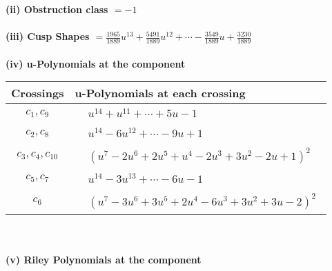 \documentclass[1p]{elsarticle_modified}
\theoremstyle{definition}
\begin{document}
\flushleft \textbf{(ii) Obstruction class $= -1$}\\~\\
\flushleft \textbf{(iii) Cusp Shapes $= \frac{1965}{1889} u^{13}+\frac{5491}{1889} u^{12}+\cdots-\frac{3549}{1889} u+\frac{3230}{1889}$}\\~\\
\newpage\renewcommand{\arraystretch}{1}
\flushleft \textbf{(iv) u-Polynomials at the component}\newline \\
\begin{tabular}{m{50pt}|m{274pt}}
Crossings & \hspace{64pt}u-Polynomials at each crossing \\
\hline $$\begin{aligned}c_{1},c_{9}\end{aligned}$$&$\begin{aligned}
&u^{14}+u^{11}+\cdots+5 u-1
\end{aligned}$\\
\hline $$\begin{aligned}c_{2},c_{8}\end{aligned}$$&$\begin{aligned}
&u^{14}-6 u^{12}+\cdots-9 u+1
\end{aligned}$\\
\hline $$\begin{aligned}c_{3},c_{4},c_{10}\end{aligned}$$&$\begin{aligned}
&(u^7-2 u^6+2 u^5+u^4-2 u^3+3 u^2-2 u+1)^2
\end{aligned}$\\
\hline $$\begin{aligned}c_{5},c_{7}\end{aligned}$$&$\begin{aligned}
&u^{14}-3 u^{13}+\cdots-6 u-1
\end{aligned}$\\
\hline $$\begin{aligned}c_{6}\end{aligned}$$&$\begin{aligned}
&(u^7-3 u^6+3 u^5+2 u^4-6 u^3+3 u^2+3 u-2)^2
\end{aligned}$\\
\hline
\end{tabular}\\~\\
\newpage\renewcommand{\arraystretch}{1}
\flushleft \textbf{(v) Riley Polynomials at the component}\newline \\
\end{document}
